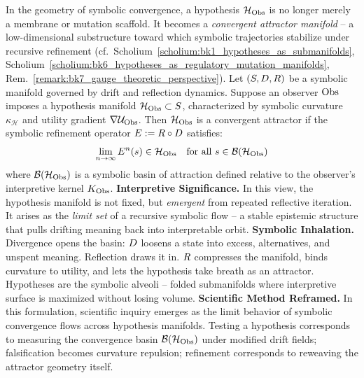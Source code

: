 \begin{scholium}
\label{scholium:bk7_hypotheses_as_convergent_attractor_manifolds}
In the geometry of symbolic convergence, a hypothesis $\mathcal{H}_{\mathrm{Obs}}$ is no longer merely a membrane or mutation scaffold. It becomes a \emph{convergent attractor manifold} -- a low-dimensional substructure toward which symbolic trajectories stabilize under recursive refinement (cf.~Scholium~\ref{scholium:bk1_hypotheses_as_submanifolds}, Scholium~\ref{scholium:bk6_hypotheses_as_regulatory_mutation_manifolds}, Rem.~\ref{remark:bk7_gauge_theoretic_perspective}). 
Let $(S, D, R)$ be a symbolic manifold governed by drift and reflection dynamics. Suppose an observer $\mathrm{Obs}$ imposes a hypothesis manifold $\mathcal{H}_{\mathrm{Obs}} \subset S$, characterized by symbolic curvature $\kappa_\mathcal{H}$ and utility gradient $\nabla \mathcal{U}_{\mathrm{Obs}}$. Then $\mathcal{H}_{\mathrm{Obs}}$ is a convergent attractor if the symbolic refinement operator $E := R \circ D$ satisfies:
\begin{equation}
\lim_{n \to \infty} E^n(s) \in \mathcal{H}_{\mathrm{Obs}} \quad \text{for all } s \in \mathcal{B}(\mathcal{H}_{\mathrm{Obs}})
\end{equation}
where $\mathcal{B}(\mathcal{H}_{\mathrm{Obs}})$ is a symbolic basin of attraction defined relative to the observer's interpretive kernel $K_{\mathrm{Obs}}$.
\textbf{Interpretive Significance.} In this view, the hypothesis manifold is not fixed, but \emph{emergent} from repeated reflective iteration. It arises as the \textit{limit set} of a recursive symbolic flow -- a stable epistemic structure that pulls drifting meaning back into interpretable orbit.
\textbf{Symbolic Inhalation.} Divergence opens the basin: \(D\) loosens a state into excess, alternatives, and unspent meaning. Reflection draws it in. \(R\) compresses the manifold, binds curvature to utility, and lets the hypothesis take breath as an attractor. Hypotheses are the symbolic alveoli -- folded submanifolds where interpretive surface is maximized without losing volume.
\textbf{Scientific Method Reframed.} In this formulation, scientific inquiry emerges as the limit behavior of symbolic convergence flows across hypothesis manifolds. Testing a hypothesis corresponds to measuring the convergence basin $\mathcal{B}(\mathcal{H}_{\mathrm{Obs}})$ under modified drift fields; falsification becomes curvature repulsion; refinement corresponds to reweaving the attractor geometry itself.
\end{scholium}
